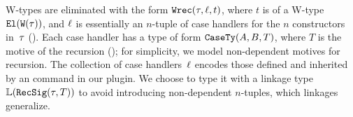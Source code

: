 W-types are eliminated with the form $\texttt{Wrec}({\tau},{\ell},{t})$, where $t$ is of a
W-type $\texttt{El}({\texttt{W}({\tau})})$, and $\ell$ is essentially an $n$-tuple of
case handlers for the $n$ constructors in~$\tau$ ().
Each case handler has a type of form $\texttt{CaseTy}({A},{B},{T})$, where
$T$ is the motive of the recursion ();
for simplicity, we model non-dependent motives for recursion.
The collection of case handlers~$\ell$ encodes those defined and inherited
by an  command in our plugin.
We choose to type it with a linkage type $\mathbb{L}({\texttt{RecSig}({\tau},{T})})$
to avoid introducing non-dependent $n$-tuples, which linkages generalize.



      
